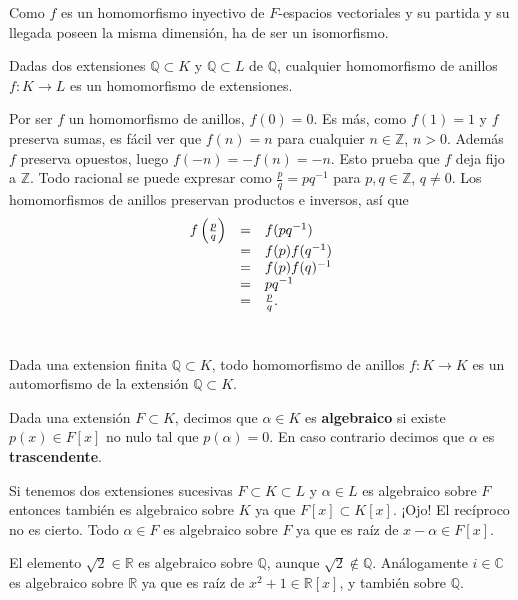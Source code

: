 
Como \(f\) es un homomorfismo inyectivo de \(F\)-espacios vectoriales y
su partida y su llegada poseen la misma dimensión, ha de ser un
isomorfismo. 


Dadas dos extensiones \(\mathbb Q\subset K\) y \(\mathbb Q\subset L\) de
\(\mathbb Q\), cualquier homomorfismo de anillos
\(f\colon K\rightarrow L\) es un homomorfismo de extensiones.


Por ser \(f\) un homomorfismo de anillos, \(f(0)=0\). Es más, como
\(f(1)=1\) y \(f\) preserva sumas, es fácil ver que \(f(n)=n\) para
cualquier \(n\in\mathbb Z\), \(n>0\). Además \(f\) preserva opuestos,
luego \(f(-n)=-f(n)=-n\). Esto prueba que \(f\) deja fijo a
\(\mathbb Z\). Todo racional se puede expresar como
\(\frac{p}{q}=pq^{-1}\) para \(p,q\in\mathbb Z\), \(q\neq 0\). Los
homomorfismos de anillos preservan productos e inversos, así que
\[\begin{array}{rcl}f\left(\frac{p}{q}\right)&=&f(pq^{-1})\cr &=&f(p)f(q^{-1})\cr &=&f(p)f(q)^{-1}\cr &=&pq^{-1}\cr &=&\frac{p}{q}.\end{array}\]\\


Dada una extension finita \(\mathbb{Q}\subset K\), todo homomorfismo de
anillos \(f\colon K\rightarrow K\) es un automorfismo de la extensión
\(\mathbb{Q}\subset K\). 


Dada una extensión \(F\subset K\), decimos que \(\alpha\in K\) es
\textbf{algebraico} si existe \(p(x)\in F[x]\) no nulo tal que
\(p(\alpha)=0\). En caso contrario decimos que \(\alpha\) es
\textbf{trascendente}. 


Si tenemos dos extensiones sucesivas \(F\subset K\subset L\) y
\(\alpha\in L\) es algebraico sobre \(F\) entonces también es algebraico
sobre \(K\) ya que \(F[x]\subset K[x]\). ¡Ojo! El recíproco no es
cierto. Todo \(\alpha\in F\) es algebraico sobre \(F\) ya que es raíz de
\(x-\alpha\in F[x]\). 

El elemento \(\sqrt{2}\in\mathbb{R}\) es algebraico sobre
\(\mathbb{Q}\), aunque \(\sqrt{2}\notin\mathbb{Q}\). Análogamente
\(i\in\mathbb{C}\) es algebraico sobre \(\mathbb{R}\) ya que es raíz de
\(x^2+1\in\mathbb{R}[x]\), y también sobre \(\mathbb{Q}\).

